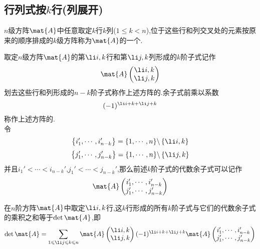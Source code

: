 \documentclass{ctexart}
\begin{document}
\subsection{行列式按$k$行(列展开)}
\begin{definition}[$k$阶子式]
    $n$级方阵$\mat{A}$中任意取定$k$行$k$列($1\leqslant k<n$),位于这些行和列交叉处的元素按原来的顺序排成的$k$级方阵称为$\mat{A}$的一个.
\end{definition}
\begin{definition}[$k$阶子式的余子式和代数余子式]
    取定$n$级方阵$\mat{A}$的第$\li i,k$行和第$\li j,k$列形成的$k$阶子式记作
    \[\mat{A}\begin{pmatrix}
        \li i,k\\\li j,k
    \end{pmatrix}\]
    划去这些行和列形成的$n-k$阶子式称作上述方阵的.余子式前乘以系数
    \[(-1)^{\li i+k+\li j+k}\]
    称作上述方阵的.\\
    令
    \[\left\{i_1',\cdots,i_{n-k}'\right\}=\{1,\cdots,n\}\backslash\left\{\li i,k\right\}\]
    \[\left\{j_1',\cdots,j_{n-k}'\right\}=\{1,\cdots,n\}\backslash\left\{\li j,k\right\}\]
    并且$i_1'<\cdots<i_{n-k}'$,$j_1'<\cdots<j_{n-k}'$,那么前述$k$阶子式的代数余子式可以记作
    \[\mat{A}\begin{pmatrix}
        i_1',\cdots,i_{n-k}'\\j_1',\cdots,j_{n-k}'
    \end{pmatrix}\]
\end{definition}
\begin{theorem}
    在$n$阶方阵$\mat{A}$中取定$\li i,k$行,这$k$行形成的所有$k$阶子式与它们的代数余子式的乘积之和等于$\det\mat{A}$,即
    \[\det\mat{A}=\sum_{1\leqslant\li j\leqslant k\leqslant n}\mat{A}\begin{pmatrix}
        \li i,k\\\li j,k
    \end{pmatrix}(-1)^{\li i+k+\li j+k}\mat{A}\begin{pmatrix}
        i_1',\cdots,i_{n-k}'\\j_1',\cdots,j_{n-k}'
    \end{pmatrix}\]
\end{theorem}
\end{document}
